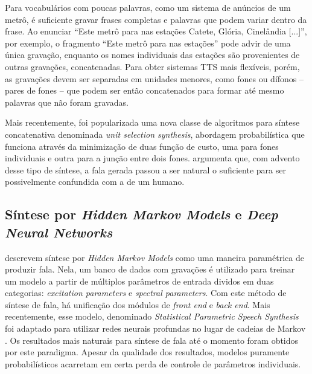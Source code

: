 Para vocabulários com poucas palavras, como um sistema de anúncios de um metrô, é
suficiente gravar frases completas e palavras que podem variar dentro da frase.
Ao enunciar ``Este metrô para nas estações Catete, Glória, Cinelândia [...]'',
por exemplo, o fragmento ``Este metrô para nas estações'' pode advir de uma
única gravação, enquanto os nomes individuais das estações são provenientes de
outras gravações, concatenadas. Para obter sistemas TTS mais flexíveis, porém,
as gravações devem ser separadas em unidades menores, como fones ou dífonos --
 pares de fones -- que podem ser então concatenados para formar até mesmo
palavras que não foram gravadas.

Mais recentemente, foi popularizada uma nova classe de algoritmos para
síntese concatenativa denominada \emph{unit selection synthesis}, abordagem
probabilística que funciona através da minimização de duas função de custo, uma
para fones individuais e outra para a junção entre dois fones.
 argumenta que, com advento desse tipo de síntese, a fala
gerada passou a ser natural o suficiente para ser possivelmente confundida com a de um humano.

\subsection{Síntese por \emph{Hidden Markov Models} e \emph{Deep Neural Networks}}
\label{hmmsynthesis}
 descrevem síntese por \emph{Hidden Markov Models} como uma
maneira paramétrica de produzir fala. Nela, um banco de dados com gravações é
utilizado para treinar um modelo a partir de múltiplos parâmetros de entrada
dividos em duas categorias: \emph{excitation parameters} e
\emph{spectral parameters}. Com este método de síntese de fala, há unificação
dos módulos de \emph{front end} e \emph{back end}. Mais recentemente, esse
modelo, denominado \emph{Statistical Parametric Speech Synthesis} foi adaptado
para utilizar redes neurais profundas no lugar de cadeias de Markov
\cite{dnngoogle}. Os resultados mais naturais para síntese de fala até o momento
foram obtidos por este paradigma. Apesar da qualidade dos resultados, modelos
puramente probabilísticos acarretam em certa perda de controle de parâmetros
individuais.


